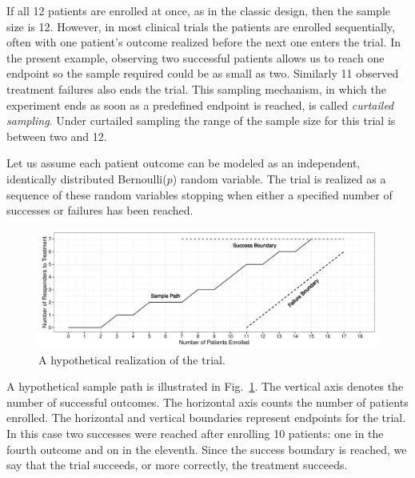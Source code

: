 \documentclass[review]{elsarticle}
\begin{document}
If all 12 patients are enrolled at once, as in the classic
design, then the sample size is 12. However, in most clinical trials the
patients are enrolled sequentially, often with one patient's outcome realized
before the next one enters the trial. In the present example, observing two
successful patients allows us to reach one endpoint so the sample required
could be as small as two. Similarly 11
observed treatment failures also ends the trial. This sampling mechanism, in
which the experiment ends as soon as a predefined endpoint is reached, is
called {\em curtailed sampling}. Under curtailed sampling the range of the
sample size for this trial is between two and 12.

Let us assume each patient outcome can be modeled as an independent,
identically distributed Bernoulli($p$) random variable. The trial is realized
as a sequence of these random variables stopping when either a
specified number of successes or failures has been reached. 

\begin{figure}[bp!]
\includegraphics[width=\textwidth]{KanePlot.pdf}
\caption{
A hypothetical realization of the trial.
}
\label{fig:kane_viz}
\end{figure}

A hypothetical sample path is illustrated in Fig.~\ref{fig:kane_viz}.
The vertical axis denotes the number of
successful outcomes. The horizontal axis counts the number of patients 
enrolled. The horizontal and vertical boundaries represent
endpoints for the trial. In this case two successes were reached after
enrolling 10 patients: one in the fourth outcome and on in the eleventh.
Since the success boundary is reached, we say that the trial succeeds,
or more correctly, the treatment succeeds.

\end{document}
